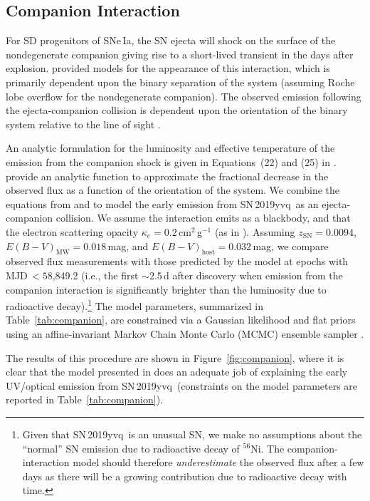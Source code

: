 \documentclass[twocolumn]{aastex63}
\newcommand{\radni}{$^{56}$Ni}
\newcommand{\sn}{SN\,2019yvq}
\begin{document}
\subsection{Companion Interaction}\label{sec:companion_interaction}

For SD progenitors of SNe\,Ia, the SN ejecta will shock on the surface of the
nondegenerate companion giving rise to a short-lived transient in the days
after explosion. \citet{Kasen10a} provided models for the appearance of this
interaction, which is primarily dependent upon the binary separation of the
system (assuming Roche lobe overflow for the nondegenerate companion). The
observed emission following the ejecta-companion collision is dependent upon
the orientation of the binary system relative to the line of sight
\citep{Kasen10a}.

An analytic formulation for the luminosity and effective temperature of the
emission from the companion shock is given in Equations~(22) and (25) in
\citet{Kasen10a}. \citet{Brown12} provide an analytic function to approximate
the fractional decrease in the observed flux as a function of the orientation
of the system. We combine the equations from \citet{Kasen10a} and
\citet{Brown12} to model the early emission from \sn\ as an ejecta-companion
collision. We assume the interaction emits as a blackbody, and that the
electron scattering opacity $\kappa_e = 0.2$\,cm$^{2}$\,g$^{-1}$ (as in
\citealt{Kasen10a}). Assuming $z_\mathrm{SN} = 0.0094$, $E(B-V)_\mathrm{MW} =
0.018$\,mag, and $E(B-V)_\mathrm{host} = 0.032$\,mag, we compare observed flux
measurements with those predicted by the \citet{Kasen10a} model at epochs with
MJD$\,< 58$,849.2 (i.e., the first $\sim$2.5\,d after discovery when emission
from the companion interaction is significantly brighter than the luminosity
due to radioactive decay).\footnote{Given that \sn\ is an unusual SN, we make
no assumptions about the ``normal'' SN emission due to radioactive decay of
\radni. The companion-interaction model should therefore
\textit{underestimate} the observed flux after a few days as there will be a
growing contribution due to radioactive decay with time.} The model
parameters, summarized in Table~\ref{tab:companion}, are constrained via a
Gaussian likelihood and flat priors using an affine-invariant
\citep{Goodman10} Markov Chain Monte Carlo (MCMC) ensemble sampler
\citep{Foreman-Mackey13}.



The results of this procedure are shown in Figure~\ref{fig:companion}, where
it is clear that the model presented in \citet{Kasen10a} does an adequate job
of explaining the early UV/optical emission from \sn\ (constraints on the
model parameters are reported in Table~\ref{tab:companion}).
\end{document}
